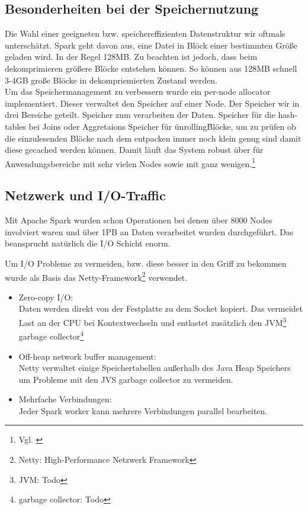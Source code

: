 \subsection{Besonderheiten bei der Speichernutzung}
Die Wahl einer geeigneten bzw. speichereffizienten Datenstruktur wir oftmals unterschätzt. 
Spark geht davon aus, eine Datei in Blöck einer bestimmten Größe geladen wird. In der Regel 128MB. Zu beachten ist jedoch, dass beim dekomprimieren größere Blöcke entstehen können. So können aus 128MB schnell 3-4GB große Blöcke in dekompriemierten Zustand werden. \\ 

\noindent
Um das Speichermanagement zu verbessern wurde ein per-node allocator implementiert. Dieser verwaltet den Speicher auf einer Node. 
Der Speicher wir in drei Bereiche geteilt. 
Speicher zum verarbeiten der Daten.  
Speicher für die hash-tables bei Joins oder Aggretaions
Speicher für \"unrolling\" Blöcke, um zu prüfen ob die einzulesenden Blöcke nach dem entpacken immer noch klein genug sind damit diese gecached werden können.
Damit läuft das System robust über für Anwendungsbereiche mit sehr vielen Nodes sowie mit ganz wenigen.\footnote{Vgl. \cite{ADD+15}}

\subsection{Netzwerk und I/O-Traffic}

Mit Apache Spark wurden schon Operationen bei denen über 8000 Nodes involviert waren und über 1PB an Daten verarbeitet wurden durchgeführt.
Das beansprucht natürlich die I/O Schicht enorm. 


Um I/O Probleme zu vermeiden, bzw. diese besser in den Griff zu bekommen wurde als Basis das Netty-Framework\footnote{Netty: High-Performance Netzwerk Framework} verwendet.
\begin{itemize}
	\item Zero-copy I/O:\\
	Daten werden direkt von der Festplatte zu dem Socket kopiert. Das vermeidet Last an der CPU bei Kontextwechseln und entlastet zusätzlich den JVM\footnote{JVM: Todo} garbage collector\footnote{garbage collector: Todo}
	\item Off-heap network buffer management:\\
	Netty verwaltet einige Speichertabellen außerhalb des Java Heap Speichers um Probleme mit den JVS garbage collector zu vermeiden.
	\item Mehrfache Verbindungen:\\
	Jeder Spark worker kann mehrere Verbindungen parallel bearbeiten.
\end{itemize}


